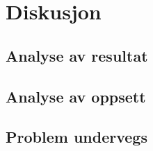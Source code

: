 \section{Diskusjon}
\subsection{Analyse av resultat}

\subsection{Analyse av oppsett}
\subsection{Problem undervegs}
